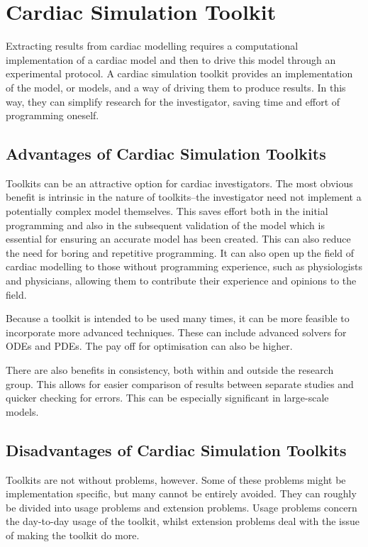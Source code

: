 \section{Cardiac Simulation Toolkit}

Extracting results from cardiac modelling requires a computational implementation
of a cardiac model and then to drive this model through an experimental
protocol.
A cardiac simulation toolkit provides an implementation of the model, or models,
and a way of driving them to produce results.
In this way, they can simplify research for the investigator, saving time and
effort of programming oneself.


\subsection{Advantages of Cardiac Simulation Toolkits}

Toolkits can be an attractive option for cardiac investigators.
The most obvious benefit is intrinsic in the nature of toolkits--the
investigator need not implement a potentially complex model themselves.
This saves effort both in the initial programming and also in the subsequent
validation of the model which is essential for ensuring an accurate model has
been created.
This can also reduce the need for boring and repetitive programming.
It can also open up the field of cardiac modelling to those without programming
experience, such as physiologists and physicians, allowing them to contribute
their experience and opinions to the field.

Because a toolkit is intended to be used many times, it can be more feasible to
incorporate more advanced techniques.
These can include advanced solvers for ODEs and PDEs.
The pay off for optimisation can also be higher.

There are also benefits in consistency, both within and outside the research
group.
This allows for easier comparison of results between separate studies and
quicker checking for errors.
This can be especially significant in large-scale models.

\subsection{Disadvantages of Cardiac Simulation Toolkits}

Toolkits are not without problems, however.
Some of these problems might be implementation specific, but many cannot be
entirely avoided.
They can roughly be divided into usage problems and extension problems.
Usage problems concern the day-to-day usage of the toolkit, whilst extension
problems deal with the issue of making the toolkit do more.

